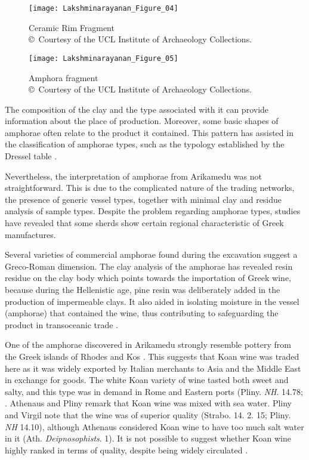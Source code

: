 \begin{figure}[!htb]
	\texttt{[image: Lakshminarayanan\_Figure\_04]}
	\caption{Ceramic Rim Fragment\\
		{\normalfont\scriptsize\copyright\ Courtesy of the UCL Institute of Archaeology Collections.
	}}
	\label{fig:Lakshminarayanan_Figure_04}
\end{figure}

\begin{figure}[!htb]
	\texttt{[image: Lakshminarayanan\_Figure\_05]}
	\caption{Amphora fragment\\
		{\normalfont\scriptsize\copyright\ Courtesy of the UCL Institute of Archaeology Collections.
	}}
	\label{fig:Lakshminarayanan_Figure_05}
\end{figure}

The composition of the clay and the type associated with it can provide information about the place of production. Moreover, some basic shapes of amphorae often relate to the product it contained. This pattern has assisted in the classification of amphorae types, such as the typology established by the Dressel table \parencite[][Pl III]{dressel1899}.

Nevertheless, the interpretation of amphorae from Arikamedu was not straightforward. This is due to the complicated nature of the trading networks, the presence of generic vessel types, together with minimal clay and residue analysis of sample types. Despite the problem regarding amphorae types, studies have revealed that some sherds show certain regional characteristic of Greek manufactures.

Several varieties of commercial amphorae found during the excavation suggest a Greco-Roman dimension. The clay analysis of the amphorae has revealed resin residue on the clay body which points towards the importation of Greek wine, because during the Hellenistic age, pine resin was deliberately added in the production of impermeable clays. It also aided in isolating moisture in the vessel (amphorae) that contained the wine, thus contributing to safeguarding the product in transoceanic trade \parencite[][222]{zlateva2015}.

One of the amphorae discovered in Arikamedu strongly resemble pottery from the Greek islands of Rhodes and Kos \parencite[][114]{begley2004}. This suggests that Koan wine was traded here as it was widely exported by Italian merchants to Asia and the Middle East in exchange for goods. The white Koan variety of wine tasted both sweet and salty, and this type was in demand in Rome and Eastern ports (Pliny. \emph{NH}. 14.78; \cite[][236-241]{sherwin-white1978}.%
Athenaus and Pliny remark that Koan wine was mixed with sea water. Pliny and Virgil note that the wine was of superior quality (Strabo. 14. 2. 15; Pliny. \emph{NH} 14.10), although Athenaus considered Koan wine to have too much salt water in it (Ath. \emph{Deipnosophists}. 1). It is not possible to suggest whether Koan wine highly ranked in terms of quality, despite being widely circulated \parencite[][16]{craik2015}.

